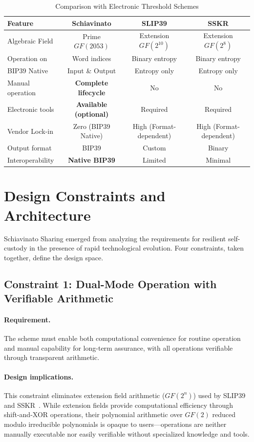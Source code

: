 \documentclass[11pt]{article}
\begin{document}
\begin{table}[t]
\centering
\caption{Comparison with Electronic Threshold Schemes}
\label{tab:electronic}
\small
\begin{tabular}{@{}lccc@{}}
\toprule
\textbf{Feature} & \textbf{Schiavinato} & \textbf{SLIP39} & \textbf{SSKR} \\ \midrule
Algebraic Field & Prime $GF(2053)$ & Extension $GF(2^{10})$ & Extension $GF(2^8)$ \\
Operation on & Word indices & Binary entropy & Binary entropy \\
BIP39 Native & Input \& Output & Entropy only & Entropy only \\
Manual operation & \textbf{Complete lifecycle} & No & No \\
Electronic tools & \textbf{Available (optional)} & Required & Required \\
Vendor Lock-in & Zero (BIP39 Native) & High (Format-dependent) & High (Format-dependent) \\
Output format & BIP39 & Custom & Binary \\
Interoperability & \textbf{Native BIP39} & Limited & Minimal \\
\bottomrule
\end{tabular}
\end{table}

\section{Design Constraints and Architecture}
\label{sec:constraints}

Schiavinato Sharing emerged from analyzing the requirements for resilient self-custody in the presence of rapid technological evolution. Four constraints, taken together, define the design space.

\subsection{Constraint 1: Dual-Mode Operation with Verifiable Arithmetic}

\paragraph{Requirement.} The scheme must enable both computational convenience for routine operation and manual capability for long-term assurance, with all operations verifiable through transparent arithmetic.

\paragraph{Design implications.} This constraint eliminates extension field arithmetic ($GF(2^n)$) used by SLIP39~\cite{slip39} and SSKR~\cite{sskr}. While extension fields provide computational efficiency through shift-and-XOR operations, their polynomial arithmetic over $GF(2)$ reduced modulo irreducible polynomials is opaque to users—operations are neither manually executable nor easily verifiable without specialized knowledge and tools.
\end{document}

